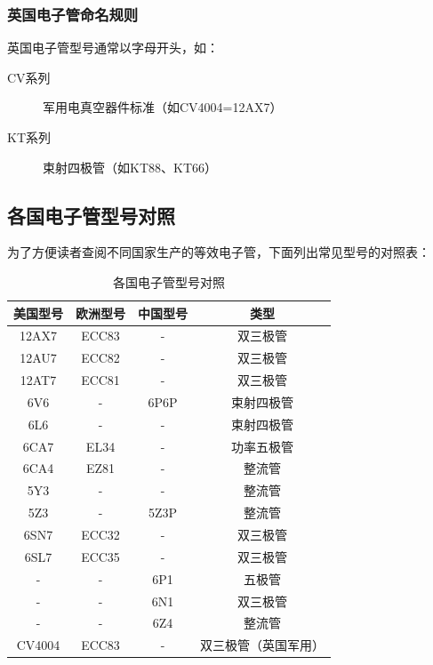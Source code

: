 \documentclass[12pt,UTF8]{ctexbook}
\begin{document}
\subsubsection{英国电子管命名规则}
英国电子管型号通常以字母开头，如：
\begin{description}
    \item[CV系列] 军用电真空器件标准（如CV4004=12AX7）
    \item[KT系列] 束射四极管（如KT88、KT66）
\end{description}

\subsection{各国电子管型号对照}

为了方便读者查阅不同国家生产的等效电子管，下面列出常见型号的对照表：

\begin{table}[htbp]
    \centering
    \caption{各国电子管型号对照}
    \label{tab:tube_cross_reference}
    \begin{tabular}{|c|c|c|c|}
        \hline
        美国型号 & 欧洲型号 & 中国型号 & 类型 \\
        \hline
        12AX7 & ECC83 & - & 双三极管 \\
        \hline
        12AU7 & ECC82 & - & 双三极管 \\
        \hline
        12AT7 & ECC81 & - & 双三极管 \\
        \hline
        6V6 & - & 6P6P & 束射四极管 \\
        \hline
        6L6 & - & - & 束射四极管 \\
        \hline
        6CA7 & EL34 & - & 功率五极管 \\
        \hline
        6CA4 & EZ81 & - & 整流管 \\
        \hline
        5Y3 & - & - & 整流管 \\
        \hline
        5Z3 & - & 5Z3P & 整流管 \\
        \hline
        6SN7 & ECC32 & - & 双三极管 \\
        \hline
        6SL7 & ECC35 & - & 双三极管 \\
        \hline
        - & - & 6P1 & 五极管 \\
        \hline
        - & - & 6N1 & 双三极管 \\
        \hline
        - & - & 6Z4 & 整流管 \\
        \hline
        CV4004 & ECC83 & - & 双三极管（英国军用） \\
        \hline
    \end{tabular}
\end{table}
\end{document}
